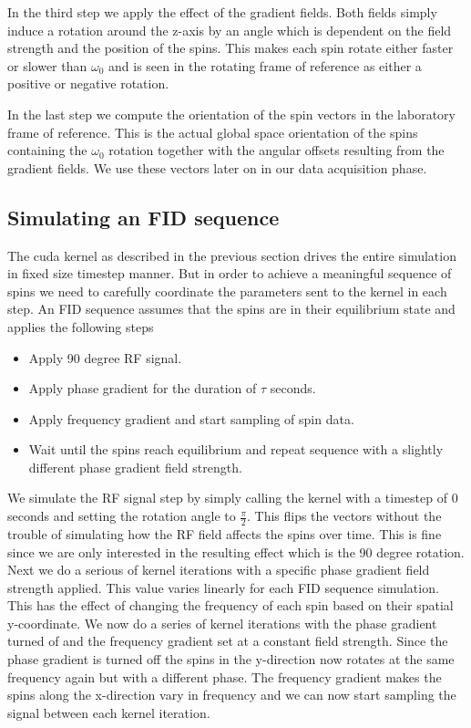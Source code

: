 In the third step we apply the effect of the gradient fields. Both
fields simply induce a rotation around the z-axis by an angle which is
dependent on the field strength and the position of the spins. This
makes each spin rotate either faster or slower than $\omega_0$ and is
seen in the rotating frame of reference as either a positive or
negative rotation. 

In the last step we compute the orientation of the spin vectors in the
laboratory frame of reference. This is the actual global space
orientation of the spins containing the $\omega_0$ rotation together
with the angular offsets resulting from the gradient fields. We use
these vectors later on in our data acquisition phase.

\subsection{Simulating an FID sequence}

The cuda kernel as described in the previous section drives the entire
simulation in fixed size timestep manner. But in order to achieve a
meaningful sequence of spins we need to carefully coordinate the
parameters sent to the kernel in each step. An FID sequence assumes
that the spins are in their equilibrium state and applies the following steps
\begin{itemize}
\item Apply 90 degree RF signal.
\item Apply phase gradient for the duration of $\tau$ seconds.
\item Apply frequency gradient and start sampling of spin data.
\item Wait until the spins reach equilibrium and repeat sequence with
  a slightly different phase gradient field strength.
\end{itemize}
We simulate the RF signal step by simply calling the kernel with a
timestep of $0$ seconds and setting the rotation angle to
$\frac{\pi}{2}$. This flips the vectors without the trouble of
simulating how the RF field affects the spins over time. This is fine
since we are only interested in the resulting effect which is the 90
degree rotation. Next we do a serious of kernel iterations with a
specific phase gradient field strength applied. This value varies
linearly for each FID sequence simulation. This has the effect of
changing the frequency of each spin based on their spatial
y-coordinate. We now do a series of kernel iterations with the phase
gradient turned of and the frequency gradient set at a constant field
strength. Since the phase gradient is turned off the spins in the
y-direction now rotates at the same frequency again but with a
different phase. The frequency gradient makes the spins along the
x-direction vary in frequency and we can now start sampling the signal
between each kernel iteration.

